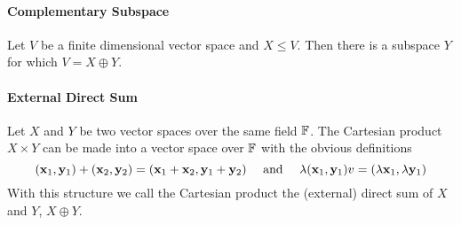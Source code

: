 \paragraph{Complementary Subspace}
Let \(V\) be a finite dimensional vector space and \(X \leq V\). Then there is a subspace \(Y\) for which \(V = X \oplus Y\).

\paragraph{External Direct Sum}
Let \(X\) and \(Y\) be two vector spaces over the same field \(\mathbb{F}\). The Cartesian product \(X \times Y\) can be made into a vector space over \(\mathbb{F}\) with the obvious definitions
\[(\mathbf{x}_1, \mathbf{y}_1) + (\mathbf{x}_2, \mathbf{y}_2) = (\mathbf{x}_1 + \mathbf{x}_2, \mathbf{y}_1 + \mathbf{y}_2) \quad \text{ and } \quad \lambda(\mathbf{x}_1, \mathbf{y}_1)v = (\lambda\mathbf{x}_1, \lambda\mathbf{y}_1)\]
With this structure we call the Cartesian product the (external) direct sum of \(X\) and \(Y\), \(X \oplus Y\). 